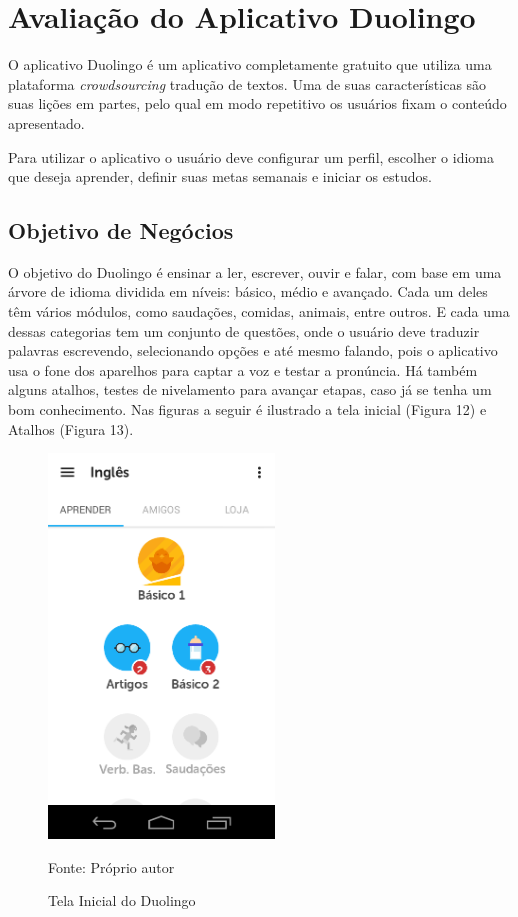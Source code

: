 \documentclass[
	12pt,				%
	openany,			%
	oneside,			%
	a4paper,			%
	english,			%
	french,				%
	spanish,			%
	brazil				%
	]{abntex2}
\begin{document}
\section{Avaliação do Aplicativo Duolingo}
O aplicativo Duolingo é um aplicativo completamente gratuito que utiliza uma plataforma \textit{crowdsourcing} tradução de textos. Uma de suas características são suas lições em partes, pelo qual em modo repetitivo os usuários fixam o conteúdo apresentado. 
	
Para utilizar o aplicativo o usuário deve configurar um perfil, escolher o idioma que deseja aprender, definir suas metas semanais e iniciar os estudos.

\subsection{Objetivo de Negócios}
O objetivo do Duolingo é ensinar a ler, escrever, ouvir e falar, com base em uma árvore de idioma dividida em níveis: básico, médio e avançado. Cada um deles têm vários módulos, como saudações, comidas, animais, entre outros. E cada uma dessas categorias tem um conjunto de questões, onde o usuário deve traduzir palavras escrevendo, selecionando opções e até mesmo falando, pois o aplicativo usa o fone dos aparelhos para captar a voz e testar a pronúncia. Há também alguns atalhos, testes de nivelamento para avançar etapas, caso já se tenha um bom conhecimento. Nas figuras a seguir é ilustrado a tela inicial (Figura 12) e Atalhos (Figura 13).

\begin{figure}[H]
    \centering
\caption{Tela Inicial do Duolingo}
\includegraphics[width=6cm]{figuras/inicialduolingo.png}
\par
 Fonte: Próprio autor
\end{figure}
\end{document}

